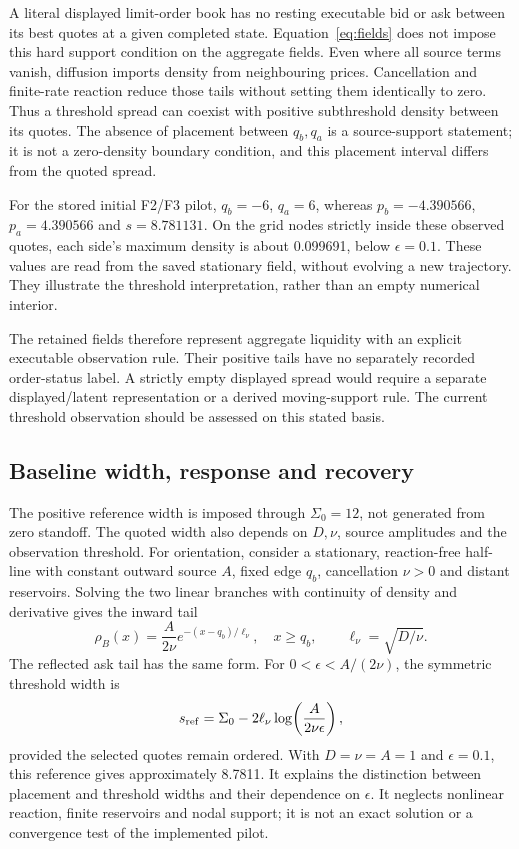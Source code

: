 \documentclass[11pt,a4paper]{article}
\begin{document}
A literal displayed limit-order book has no resting executable bid or ask between its best quotes at a given completed state. Equation~\eqref{eq:fields} does not impose this hard support condition on the aggregate fields. Even where all source terms vanish, diffusion imports density from neighbouring prices. Cancellation and finite-rate reaction reduce those tails without setting them identically to zero. Thus a threshold spread can coexist with positive subthreshold density between its quotes. The absence of placement between $q_b,q_a$ is a source-support statement; it is not a zero-density boundary condition, and this placement interval differs from the quoted spread.

For the stored initial F2/F3 pilot, $q_b=-6$, $q_a=6$, whereas $p_b=-4.390566$, $p_a=4.390566$ and $s=8.781131$. On the grid nodes strictly inside these observed quotes, each side's maximum density is about 0.099691, below $\epsilon=0.1$. These values are read from the saved stationary field, without evolving a new trajectory. They illustrate the threshold interpretation, rather than an empty numerical interior.

The retained fields therefore represent aggregate liquidity with an explicit executable observation rule. Their positive tails have no separately recorded order-status label. A strictly empty displayed spread would require a separate displayed/latent representation or a derived moving-support rule. The current threshold observation should be assessed on this stated basis.

\subsection{Baseline width, response and recovery}
The positive reference width is imposed through $\Sigma_0=12$, not generated from zero standoff. The quoted width also depends on $D,\nu$, source amplitudes and the observation threshold. For orientation, consider a stationary, reaction-free half-line with constant outward source $A$, fixed edge $q_b$, cancellation $\nu>0$ and distant reservoirs. Solving the two linear branches with continuity of density and derivative gives the inward tail
\begin{equation}
\rho_B(x)=\frac{A}{2\nu}e^{-(x-q_b)/\ell_\nu},\quad x\geq q_b,
\qquad \ell_\nu=\sqrt{D/\nu}.
\end{equation}
The reflected ask tail has the same form. For $0<\epsilon<A/(2\nu)$, the symmetric threshold width is
\begin{equation}\label{eq:width-reference}
s_{\rm ref}=\Sigma_0-2\ell_\nu\log\!\left(\frac{A}{2\nu\epsilon}\right),
\end{equation}
provided the selected quotes remain ordered. With $D=\nu=A=1$ and $\epsilon=0.1$, this reference gives approximately 8.7811. It explains the distinction between placement and threshold widths and their dependence on $\epsilon$. It neglects nonlinear reaction, finite reservoirs and nodal support; it is not an exact solution or a convergence test of the implemented pilot.
\end{document}
